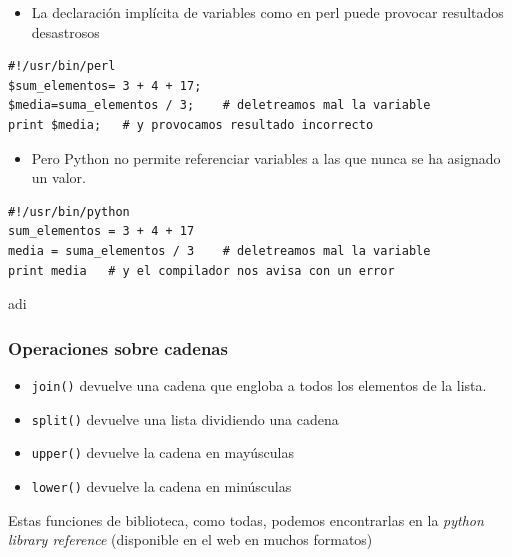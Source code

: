 \documentclass{beamer}
\begin{document}
\begin{frame}[fragile]

\begin{itemize}
  
\item 
La declaración implícita de variables como en perl puede provocar resultados desastrosos
\end{itemize}

\begin{footnotesize}
\begin{verbatim}
#!/usr/bin/perl
$sum_elementos= 3 + 4 + 17;
$media=suma_elementos / 3;    # deletreamos mal la variable
print $media;   # y provocamos resultado incorrecto
\end{verbatim}
\end{footnotesize}

\begin{itemize}
\item 
Pero Python no permite referenciar variables a las que nunca se ha
asignado un valor.
\end{itemize}
\begin{footnotesize}
\begin{verbatim}
#!/usr/bin/python
sum_elementos = 3 + 4 + 17
media = suma_elementos / 3    # deletreamos mal la variable
print media   # y el compilador nos avisa con un error
\end{verbatim}
\end{footnotesize}
adi

\end{frame}


\begin{frame}[fragile]
\frametitle{Operaciones sobre cadenas}

\begin{itemize}
\item \verb|join()| devuelve una cadena que engloba a todos los elementos de la lista.\\
\item \verb|split()| devuelve una lista dividiendo una cadena\\
\item \verb|upper()| devuelve la cadena en mayúsculas\\
\item \verb|lower()| devuelve la cadena en minúsculas\\
\end{itemize}

Estas funciones de biblioteca, como todas, podemos encontrarlas
en la \emph{python library reference}
(disponible en el web en muchos formatos)

\end{frame}
\end{document}
